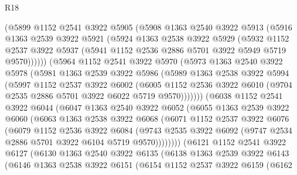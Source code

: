 \begin{lexlean}{R18}
\begin{coremodule}
{{{{{{{{{{{{{{{{{{{        (@5899
          @1152
          @2541
          @3922
          @5905
          (@5908
            @1363
            @2540
            @3922
            @5913
            (@5916
              @1363
              @2539
              @3922
              @5921
              (@5924
                @1363
                @2538
                @3922
                @5929
                (@5932
                  @1152
                  @2537
                  @3922
                  @5937
                  (@5941 @1152 @2536 @2886 @5701 @3922 @5949 @5719 @9570))))))
        (@5964
          @1152
          @2541
          @3922
          @5970
          (@5973
            @1363
            @2540
            @3922
            @5978
            (@5981
              @1363
              @2539
              @3922
              @5986
              (@5989
                @1363
                @2538
                @3922
                @5994
                (@5997
                  @1152
                  @2537
                  @3922
                  @6002
                  (@6005
                    @1152
                    @2536
                    @3922
                    @6010
                    (@9704 @2535 @2886 @5701 @3922 @6022 @5719 @9570)))))))
        (@6038
          @1152
          @2541
          @3922
          @6044
          (@6047
            @1363
            @2540
            @3922
            @6052
            (@6055
              @1363
              @2539
              @3922
              @6060
              (@6063
                @1363
                @2538
                @3922
                @6068
                (@6071
                  @1152
                  @2537
                  @3922
                  @6076
                  (@6079
                    @1152
                    @2536
                    @3922
                    @6084
                    (@9743
                      @2535
                      @3922
                      @6092
                      (@9747 @2534 @2886 @5701 @3922 @6104 @5719 @9570))))))))
        (@6121
          @1152
          @2541
          @3922
          @6127
          (@6130
            @1363
            @2540
            @3922
            @6135
            (@6138
              @1363
              @2539
              @3922
              @6143
              (@6146
                @1363
                @2538
                @3922
                @6151
                (@6154
                  @1152
                  @2537
                  @3922
                  @6159
                  (@6162
}}}}}}}}}}}}}}}}}}}
\end{coremodule}
\end{lexlean}
